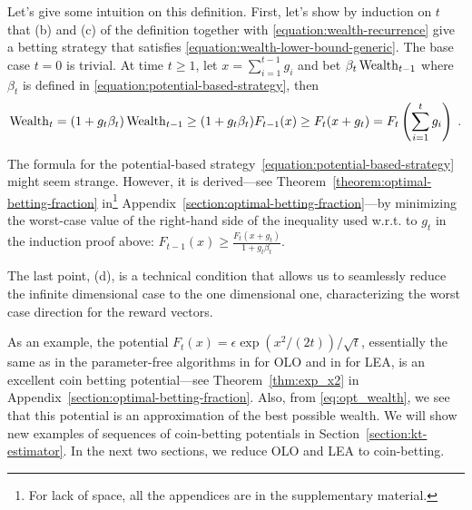 Let's give some intuition on this definition.  First, let's show by induction
on $t$ that (b) and (c) of the definition together with
\eqref{equation:wealth-recurrence} give a betting strategy that satisfies
\eqref{equation:wealth-lower-bound-generic}. The base case $t=0$ is trivial. At
time $t \ge 1$, let $x = \sum_{i=1}^{t-1} g_i$ and bet $\beta_t \operatorname{Wealth}_{t-1}$
where $\beta_t$ is defined in \eqref{equation:potential-based-strategy}, then
\vspace{-.2cm}
\[
\operatorname{Wealth}_t
= (1+g_t \beta_t) \operatorname{Wealth}_{t-1}
\ge (1 + g_t \beta_t) F_{t-1}(x)
\ge F_t(x + g_t)
= F_t \left( \sum_{i=1}^t g_i \right) \; .
\]

The formula for the potential-based
strategy~\eqref{equation:potential-based-strategy} might seem strange. However,
it is derived---see Theorem~\ref{theorem:optimal-betting-fraction} in\footnote{For lack of space, all the appendices are in the supplementary material.}
Appendix~\ref{section:optimal-betting-fraction}---by minimizing the worst-case
value of the right-hand side of the inequality used w.r.t. to $g_t$ in the
induction proof above: $F_{t-1}(x) \ge \tfrac{F_{t}(x + g_t)}{1+g_t\beta_t}$.

The last point, (d), is a technical condition that allows us to
seamlessly reduce the infinite dimensional case to the one dimensional one, characterizing the worst case direction for the reward vectors.

As an example, the potential $F_t(x)=\epsilon
\exp \left(x^2/(2t)\right)/\sqrt{t}$, essentially the same as in
the parameter-free algorithms in \cite{McMahan-Orabona-2014, Orabona-2014} for
\ac{OLO} and in \cite{Chaudhuri-Freund-Hsu-2009, Luo-Schapire-2014,
Luo-Schapire-2015} for \ac{LEA}, is an excellent coin betting potential---see Theorem~\ref{thm:exp_x2} in Appendix~\ref{section:optimal-betting-fraction}.  Also, from \eqref{eq:opt_wealth}, we see that this potential is an approximation of the best possible wealth.
We will show new examples of sequences of coin-betting potentials in
Section~\ref{section:kt-estimator}.  In the next two sections, we reduce
\ac{OLO} and \ac{LEA} to coin-betting.
